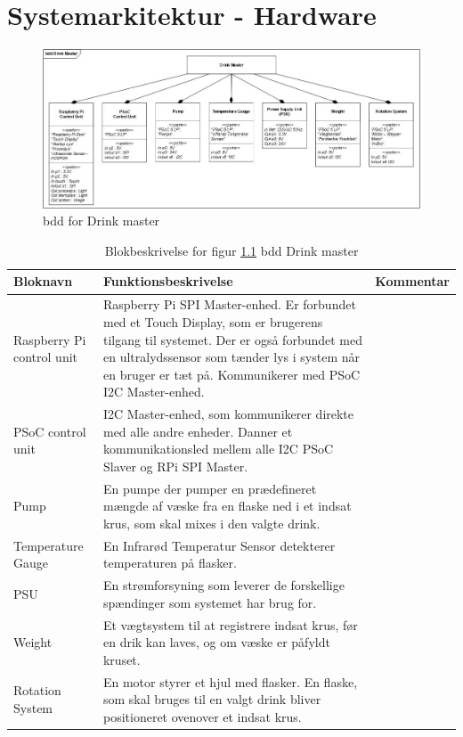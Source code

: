 \chapter{Systemarkitektur - Hardware}

\begin{figure}[h!]
	\centering
	\includegraphics[width=1.2\textwidth, angle =270]{Images/BDD_System_JPEG.jpg}
	\caption{bdd for Drink master}
	\label{fig:bdd}
\end{figure}
\FloatBarrier

\begin{table}[H] 
	\centering 
	\caption{Blokbeskrivelse for figur \ref{fig:bdd} bdd Drink master}
	\begin{tabular}{|p{3cm}|p{7cm}|p{3cm}|}
		\hline
\textbf{Bloknavn} & \textbf{Funktionsbeskrivelse}  &  \textbf{Kommentar}  \\ \hline
Raspberry Pi control unit    & Raspberry Pi SPI Master-enhed. Er forbundet med et Touch Display, som er brugerens tilgang til systemet. Der er også forbundet med en ultralydssensor som tænder lys i system når en bruger er tæt på. Kommunikerer med PSoC I2C Master-enhed. &  \\ \hline
PSoC control unit & I2C Master-enhed, som kommunikerer direkte med alle andre enheder. Danner et kommunikationsled mellem alle I2C PSoC Slaver og RPi SPI Master.    &  \\ \hline
Pump              & En pumpe der pumper en prædefineret mængde af væske fra en flaske ned i et indsat krus, som skal mixes i den valgte drink.                       &  \\ \hline
Temperature Gauge & En Infrarød Temperatur Sensor detekterer temperaturen på flasker.                                                                                &  \\ \hline
PSU               & En strømforsyning som leverer de forskellige spændinger som systemet har brug for.                                                                               &  \\  \hline
Weight            & Et vægtsystem til at registrere indsat krus, før en drik kan laves, og om væske er påfyldt kruset.                                                                      &  \\ \hline
Rotation System   & En motor styrer et hjul med flasker. En flaske, som skal bruges til en valgt drink bliver positioneret ovenover et indsat krus.                  &  \\ \hline

		\hline 
	\end{tabular}
	\label{tab:blokbeskrivelse}
\end{table}
\FloatBarrier

